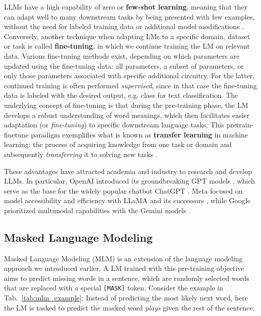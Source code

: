 LLMs have a high capability of zero or \textbf{few-shot learning}, meaning that
they can adapt well to many downstream tasks by being presented with few
examples, without the need for labeled training data or additional model
modifications \cite{brown2020language}. Conversely, another technique when
adapting LMs to a specific domain, dataset or task is called
\textbf{fine-tuning}, in which we continue training the LM on relevant data.
Various fine-tuning methods exist, depending on which parameters are updated
using the fine-tuning data: all parameters, a subset of parameters, or only
those parameters associated with specific additional circuitry. For the latter,
continued training is often performed \textit{supervised}, since in that case
the fine-tuning data is labeled with the desired output, e.g. class for text
classification. The underlying concept of fine-tuning is that during the
pre-training phase, the LM develops a robust understanding of word meanings,
which then facilitates easier adaptation (or \textit{fine-tuning}) to specific
downstream language tasks. This pretrain-finetune paradigm exemplifies what is
known as \textbf{transfer learning} in machine learning: the process of
acquiring knowledge from one task or domain and subsequently
\textit{transferring} it to solving new tasks \cite{durrani2021transfer}.

These advantages have attracted academia and industry to research and develop
LLMs. In particular, OpenAI introduced its groundbreaking GPT models
\cite{radford2019gpt2, brown2020language, achiam2023gpt}, which serve as the
base for the widely popular chatbot ChatGPT \cite{openai2023chatgpt}. Meta
focused on model accessibility and efficiency with LLaMA
\cite{touvron2023llama1} and its successors \cite{touvron2023llama2,
dubey2024llama3}, while Google prioritized multimodal capabilities with the
Gemini models \cite{rohan2023gemini, georgiev2024gemini}.

\subsection{Masked Language Modeling}

Masked Language Modeling (MLM) is an extension of the language modeling approach
we introduced earlier. A LM trained with this pre-training objective aims to
predict missing words in a sentence, which are randomly selected words that are
replaced with a special \texttt{[MASK]} token. Consider the example in
Tab.~\ref{tab:mlm_example}: Instead of predicting the most likely next word,
here the LM is tasked to predict the masked word \textit{plays} given the rest
of the sentence.

